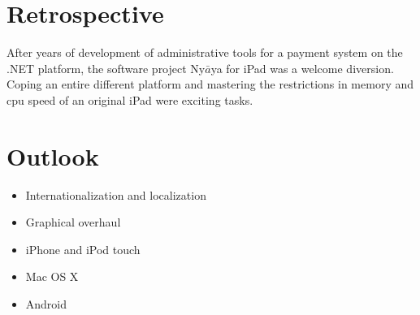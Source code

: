 
\section{Retrospective}

After years of development of administrative tools for a payment system on the .NET platform, 
the software project Ny$\bar{a}$ya for iPad was a welcome diversion.
Coping an entire different platform and mastering the restrictions in memory and cpu speed of an original iPad were
exciting tasks. 

\section{Outlook}

\begin{itemize}

\item Internationalization and localization

\item Graphical overhaul

\item iPhone and iPod touch

\item Mac OS X

\item Android

\end{itemize}




